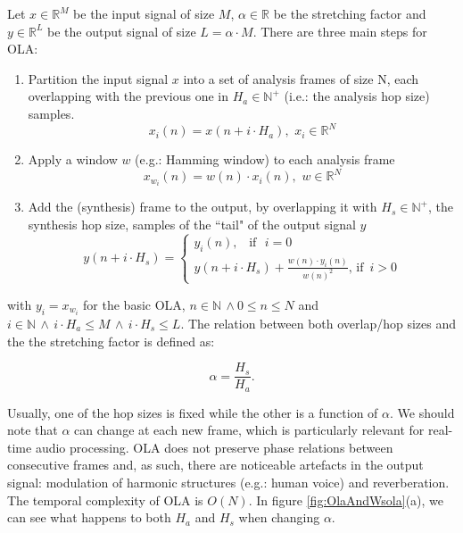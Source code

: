 \documentclass{sig-alternate}
\begin{document}
 Let $x \in \mathbb{R}^M$ be the input signal of size $M$, $\alpha \in \mathbb{R}$ be the stretching factor and $y \in \mathbb{R}^L$ be the output signal of size $L=\alpha \cdot M$. There are three main steps for OLA:
\begin{enumerate}
	\item Partition the input signal $x$ into a set of analysis frames of size N, each overlapping with the previous one in $H_a \in \mathbb{N}^+$ (i.e.: the analysis hop size) samples.
\begin{equation}
x_i(n) = x(n + i \cdot H_a), \,\, x_i \in \mathbb{R}^N
\end{equation}
	\item Apply a window $w$ (e.g.: Hamming window) to each analysis frame
\begin{equation}
x_{w_i}(n) = w(n) \cdot x_i(n), \,\, w \in \mathbb{R}^N
\end{equation}
	\item Add the (synthesis) frame to the output, by overlapping it with $H_s \in \mathbb{N}^+$, the synthesis hop size, samples of the ``tail" of the output signal $y$
\begin{equation}
y(n+i \cdot H_s) = \left\{\begin{array}{lll}
	y_i(n),\,\,\,\,\,\textrm{if}\,\,\,\,i=0 \\
	y(n+i \cdot H_s) + \frac{w(n) \cdot y_i(n)}{w(n)^2},\,\textrm{if}\,\,\,i>0
	\end{array}\right.
\end{equation}
\end{enumerate}
with $y_i = x_{w_i}$ for the basic OLA, $n \in \mathbb{N} \, \land 0 \leq n \leq N$ and $i \in \mathbb{N} \, \land \, i \cdot H_a \leq M \, \land \, i \cdot H_s \leq L$. The relation between both overlap/hop sizes and the the stretching factor is defined as:

\begin{equation}
\alpha = \frac{H_s}{H_a}. %
\end{equation}

Usually, one of the hop sizes is fixed while the other is a function of $\alpha$. We should note that $\alpha$ can change at each new frame, which is particularly relevant for real-time audio processing. OLA does not preserve phase relations between consecutive frames and, as such, there are noticeable artefacts in the output signal: modulation of harmonic structures (e.g.: human voice) and reverberation. The temporal complexity of OLA is $O(N)$. In figure \ref{fig:OlaAndWsola}(a), we can see what happens to both $H_a$ and $H_s$ when changing $\alpha$.
\end{document}
